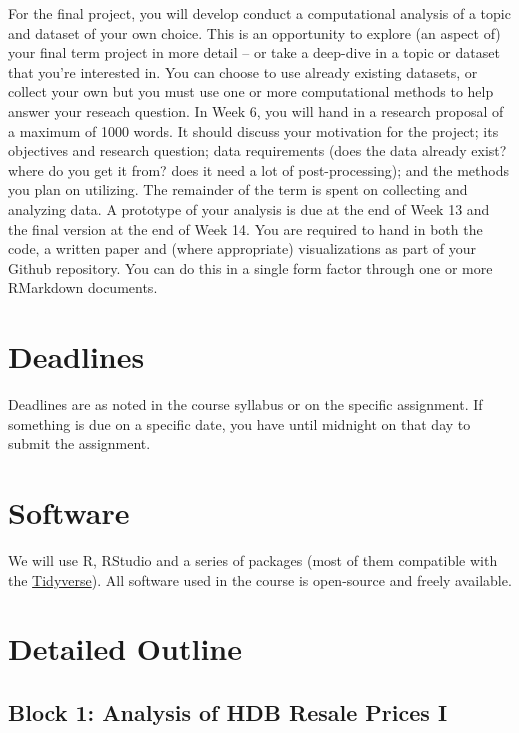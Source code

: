 \documentclass[]{book}
\begin{document}
For the final project, you will develop conduct a computational analysis of a topic and dataset of your own choice. This is an opportunity to explore (an aspect of) your final term project in more detail -- or take a deep-dive in a topic or dataset that you're interested in. You can choose to use already existing datasets, or collect your own but you must use one or more computational methods to help answer your reseach question. In Week 6, you will hand in a research proposal of a maximum of 1000 words. It should discuss your motivation for the project; its objectives and research question; data requirements (does the data already exist? where do you get it from? does it need a lot of post-processing); and the methods you plan on utilizing. The remainder of the term is spent on collecting and analyzing data. A prototype of your analysis is due at the end of Week 13 and the final version at the end of Week 14. You are required to hand in both the code, a written paper and (where appropriate) visualizations as part of your Github repository. You can do this in a single form factor through one or more RMarkdown documents.

\hypertarget{deadlines}{%
\section{Deadlines}\label{deadlines}}

Deadlines are as noted in the course syllabus or on the specific assignment. If something is due on a specific date, you have until midnight on that day to submit the assignment.

\hypertarget{software}{%
\section{Software}\label{software}}

We will use R, RStudio and a series of packages (most of them compatible with the \href{https://www.tidyverse.org/}{Tidyverse}). All software used in the course is open-source and freely available.

\hypertarget{detailed-outline}{%
\section{Detailed Outline}\label{detailed-outline}}

\hypertarget{block-1-analysis-of-hdb-resale-prices-i}{%
\subsection{Block 1: Analysis of HDB Resale Prices I}\label{block-1-analysis-of-hdb-resale-prices-i}}
\end{document}
